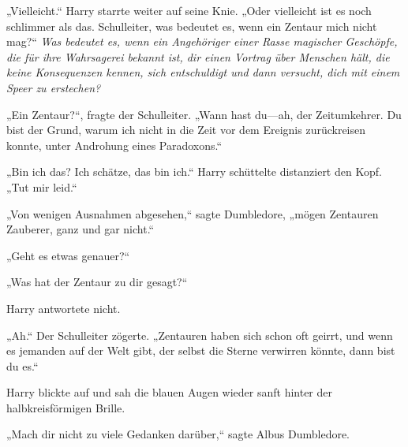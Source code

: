 „Vielleicht.“ Harry starrte weiter auf seine Knie. „Oder vielleicht ist es noch schlimmer als das. Schulleiter, was bedeutet es, wenn ein Zentaur mich nicht mag?“
\emph{Was bedeutet es, wenn ein Angehöriger einer Rasse magischer Geschöpfe, die für ihre Wahrsagerei bekannt ist, dir einen Vortrag über Menschen hält, die keine Konsequenzen kennen, sich entschuldigt und dann versucht, dich mit einem Speer zu erstechen?}

„Ein Zentaur?“, fragte der Schulleiter. „Wann hast du—ah, der Zeitumkehrer. Du bist der Grund, warum ich nicht in die Zeit vor dem Ereignis zurückreisen konnte, unter Androhung eines Paradoxons.“

„Bin ich das? Ich schätze, das bin ich.“ Harry schüttelte distanziert den Kopf. „Tut mir leid.“

„Von wenigen Ausnahmen abgesehen,“ sagte Dumbledore, „mögen Zentauren Zauberer, ganz und gar nicht.“

„Geht es etwas genauer?“

„Was hat der Zentaur zu dir gesagt?“

Harry antwortete nicht.

„Ah.“ Der Schulleiter zögerte. „Zentauren haben sich schon oft geirrt, und wenn es jemanden auf der Welt gibt, der selbst die Sterne verwirren könnte, dann bist du es.“

Harry blickte auf und sah die blauen Augen wieder sanft hinter der halbkreisförmigen Brille.

„Mach dir nicht zu viele Gedanken darüber,“ sagte Albus Dumbledore.

